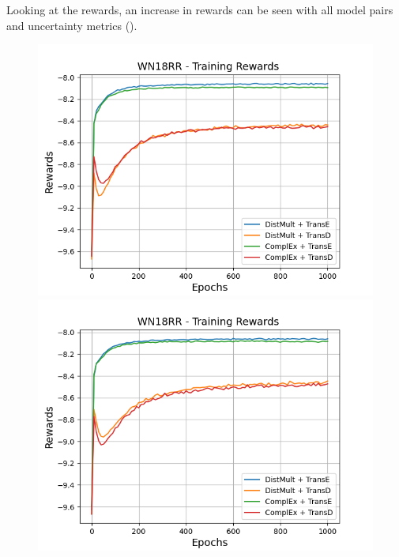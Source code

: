 Looking at the rewards, an increase in rewards can be seen with all model pairs and uncertainty metrics ().
\begin{figure}
    \centering
    \begin{minipage}{.5\textwidth}
      \centering
      \includegraphics[width=0.9\linewidth]{figures/results/gan_train/not_pretrained/uncertainty/max_distribution/entropy/wn18rr/1k_epochs/uncertainty_wn18rr_rew.png}
    \end{minipage}%
    \begin{minipage}{.5\textwidth}
      \centering
      \includegraphics[width=0.9\linewidth]{figures/results/gan_train/not_pretrained/uncertainty/max_distribution/least_confidence/wn18rr/uncertainty_wn18rr_rew.png}
    \end{minipage}
    \begin{minipage}{.5\textwidth}

\end{minipage}
\end{figure}
